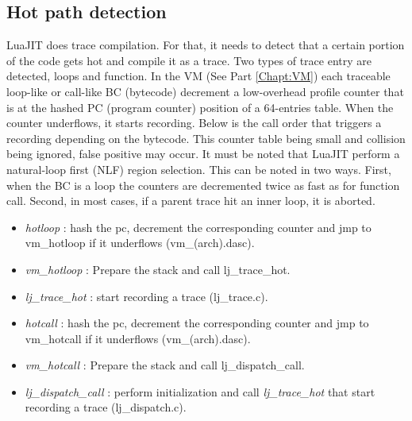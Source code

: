 

\subsection{Hot path detection}
\label{Subsec:hot-path}

LuaJIT does trace compilation. For that, it needs to detect that a certain
portion of the code gets hot and compile it as a trace. Two types of trace entry
are detected, loops and function. In the VM (See Part \ref{Chapt:VM}) each
traceable loop-like or call-like BC (bytecode) decrement a low-overhead profile
counter that is at the hashed PC (program counter) position of a 64-entries table.
When the counter underflows, it starts recording. Below is the call order that
triggers a recording depending on the bytecode. This counter table being small
and collision being ignored, false positive may occur.
It must be noted that LuaJIT perform a natural-loop first (NLF) region selection.
This can be noted in two ways. First, when the BC is a loop the counters are
decremented twice as fast as for function call. Second, in most cases, if a
parent trace hit an inner loop, it is aborted.


\begin{itemize}
	\item \emph{hotloop} : hash the pc, decrement the corresponding counter and
jmp to vm\_hotloop if it underflows (vm\_(arch).dasc).
	\item \emph{vm\_hotloop} : Prepare the stack and call lj\_trace\_hot.
	\item \emph{lj\_trace\_hot} : start recording a trace (lj\_trace.c).
\end{itemize}


\begin{itemize}
	\item \emph{hotcall} : hash the pc, decrement the corresponding counter and
jmp to vm\_hotcall if it underflows (vm\_(arch).dasc).
	\item \emph{vm\_hotcall} : Prepare the stack and call lj\_dispatch\_call.
	\item \emph{lj\_dispatch\_call} : perform initialization
	and call \emph{lj\_trace\_hot} that start recording a trace (lj\_dispatch.c).
\end{itemize}

